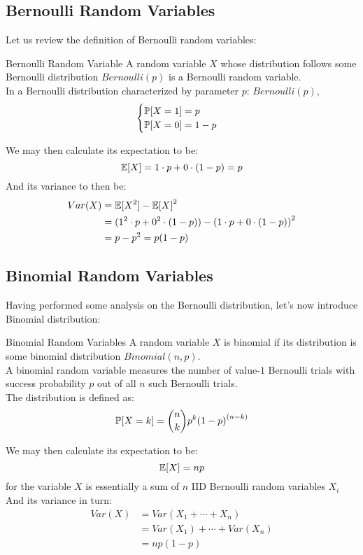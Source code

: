 \subsection{Bernoulli Random Variables}
Let us review the definition of Bernoulli random variables:
\begin{ln-define}{Bernoulli Random Variable}{}
    A random variable $X$ whose distribution follows some Bernoulli distribution $Bernoulli(p)$ is a Bernoulli random variable. \\
    In a Bernoulli distribution characterized by parameter $p$: $Bernoulli(p)$,
    \[
        \begin{cases}
            \P[X = 1] = p \\
            \P[X = 0] = 1 - p
        \end{cases}
    \]
\end{ln-define}
We may then calculate its expectation to be:
\[\E[X] = 1 \cdot p + 0 \cdot (1 - p) = p\]
And its variance to then be:
\begin{align*}
    Var(X) &= \E[X^2] - {\E[X]}^2 \\
    &= (1^2 \cdot p + 0^2 \cdot (1 - p)) - {(1 \cdot p + 0 \cdot (1 - p))}^2 \\
    &= p - p^2 = p(1 - p)
\end{align*}

\subsection{Binomial Random Variables}
Having performed some analysis on the Bernoulli distribution, let's now introduce Binomial distribution:
\begin{ln-define}{Binomial Random Variables}
    A random variable $X$ is binomial if its distribution is some binomial distribution $Binomial(n, p)$. \\
    A binomial random variable measures the number of value-$1$ Bernoulli trials with success probability $p$ out of all $n$ such Bernoulli trials. \\
    The distribution is defined as:
    \[
        \P[X = k] = \binom{n}{k} p^k {(1 - p)}^{(n - k)}
    \]
\end{ln-define}
We may then calculate its expectation to be:
\[\E[X] = np\]
for the variable $X$ is essentially a sum of $n$ IID Bernoulli random variables $X_i$
And its variance in turn:
\begin{align*}
    Var(X) &= Var(X_1 + \cdots + X_n) \\
    &= Var(X_1) + \cdots + Var(X_n) \\
    &= np(1 - p)
\end{align*}
